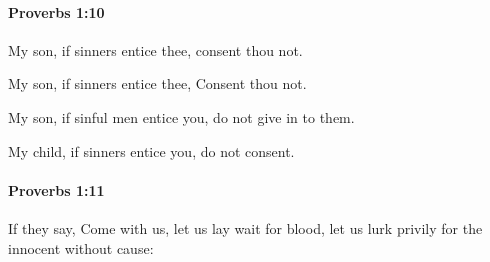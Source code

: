 		\paragraph{Proverbs 1:10} %
			\label{PROVERBS-1-10}

			My son, if sinners entice thee, consent thou not.

			\begin{versebox}
					\item[BHS] 
					\item[ASV] My son, if sinners entice thee, Consent thou not.
					\item[NIV] My son, if sinful men entice you, do not give in to them.
					\item[NRSV] My child, if sinners entice you, do not consent.
			\end{versebox}

		\paragraph{Proverbs 1:11} %
			\label{PROVERBS-1-11}

			If they say, Come with us, let us lay wait for blood, let us lurk privily for the innocent without cause:


